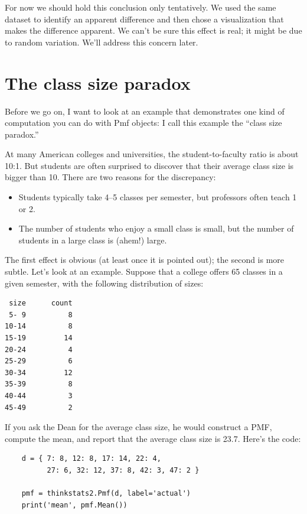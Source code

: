 \documentclass[12pt]{book}
\begin{document}
For now we should hold this conclusion only tentatively.
We used the same dataset to identify an
apparent difference and then chose a visualization that makes the
difference apparent.  We can't be sure this effect is real;
it might be due to random variation.  We'll address this concern
later.


\section{The class size paradox}

Before we go on, I want to look at an example that demonstrates
one kind of computation you can do with Pmf objects: I call
this example the ``class size paradox.''

At many American colleges and universities, the student-to-faculty
ratio is about 10:1.  But students are often surprised to discover
that their average class size is bigger than 10.  There
are two reasons for the discrepancy:

\begin{itemize}

\item Students typically take 4--5 classes per semester, but
professors often teach 1 or 2.

\item The number of students who enjoy a small class is small,
but the number of students in a large class is (ahem!) large.

\end{itemize}

The first effect is obvious (at least once it is pointed out);
the second is more subtle.  Let's look at an example.  Suppose
that a college offers 65 classes in a given semester, with the
following distribution of sizes:
%
\begin{verbatim}
 size      count
 5- 9          8
10-14          8
15-19         14
20-24          4
25-29          6
30-34         12
35-39          8
40-44          3
45-49          2
\end{verbatim}

If you ask the Dean for the average class size, he would
construct a PMF, compute the mean, and report that the
average class size is 23.7.  Here's the code:

\begin{verbatim}
    d = { 7: 8, 12: 8, 17: 14, 22: 4, 
          27: 6, 32: 12, 37: 8, 42: 3, 47: 2 }

    pmf = thinkstats2.Pmf(d, label='actual')
    print('mean', pmf.Mean())
\end{verbatim}
\end{document}
